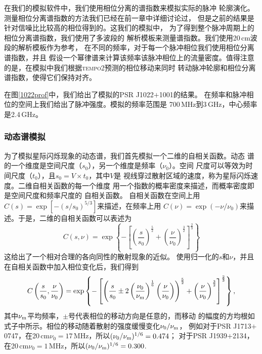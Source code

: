 在我们的模拟软件中，我们使用相位分离的谱指数来模拟实际的脉冲
轮廓演化。测量相位分离谱指数的方法我们已经在前一章中详细讨论过，
但是之前的结果是针对信噪比比较高的相位得到的。这我们的模拟中，
为了得到整个脉冲周期上的相位分离谱指数，我们使用了多波段的
解析模板来测量谱指数。我们使用20\,cm波段的解析模板作为参考，
在不同的频率，对于每一个脉冲相位我们使用相位分离谱指数，并且
假设一个幂律谱来计算该频率该脉冲相位上的流量密度。值得注意
的是，在模拟中我们根据\textsc{tempo2}预测的相位移动来同时
转动脉冲轮廓和相位分离谱指数，使得它们保持对齐。

在图\ref{1022prof}中，我们给出了模拟的PSR J1022$+$1001的结果。
在频率和脉冲相位的空间上我们给出了脉冲强度。模拟的频率范围是
700\,MHz到3\,GHz，中心频率是2.4\,GHz。

\subsubsection{动态谱模拟}

为了模拟星际闪烁现象的动态谱，我们首先模拟一个二维的自相关函数。动态
谱的一个维度是空间尺度（$s_0$），另一个维度是频率（$\nu_0$）。空间
尺度可以等效为时间尺度（$t_0$），且$s_0 = V\times t_0$，其中$V$是
视线穿过散射区域的速度，称为星际闪烁速度。二维自相关函数的每一个维度
用一个指数的概率密度来描述，而概率密度即是空间尺度和频率尺度的
自相关函数。
%
自相关函数在空间上用$C(s) = \exp[-(s/s_0)^{5/3}]$来描述，在频率上用
$C(\nu) = \exp(-\nu/\nu_0)$来描述。于是，二维的自相关函数可以表述为
\begin{equation}
\label{acf}
C(s,\nu) = \exp\left\{-\left[\left(\frac{s}{s_0}\right)^{\frac{5}{2}} + \left(\frac{\nu}{\nu_0}\right)^{\frac{3}{2}}\right]^{\frac{2}{3}}\right\}
\end{equation}
这给出了一个相对合理的各向同性的散射现象的近似。
%
使用归一化的$s$和$\nu$，并且在自相关函数中加入相位变化后，我们得到
\begin{equation}
C\left(\frac{s}{s_0},\frac{\nu}{\nu_0}\right)=\exp\left\{-\left[\left(\frac{s}{s_0} \pm 2\left(\frac{\nu_0}{\nu_{\rm{m}}}\right)^{\frac{1}{6}}\left(\frac{\nu}{\nu_0}\right)\right)^{\frac{5}{2}} + \left(\frac{\nu}{\nu_0}\right)^{\frac{3}{2}}\right]^{\frac{2}{3}}\right\},
\end{equation}
其中$\nu_{\rm{m}}$平均频率，$\pm$号代表相位的移动方向是任意的，而移动
的幅度的方均根如式子中所示。相位的移动随着散射的强度缓慢变化$\nu_0/\nu_{\rm{m}}$，
例如对于PSR J1713$+$0747，在20\,cm$\nu_0=17$\,MHz，所以$(\nu_0/\nu_{\rm{m}})^{1/6} = 0.474$；
对于PSR J1939$+$2134，在20\,cm$\nu_0=1$\,MHz，所以$(\nu_0/\nu_{\rm{m}})^{1/6} = 0.300$.

